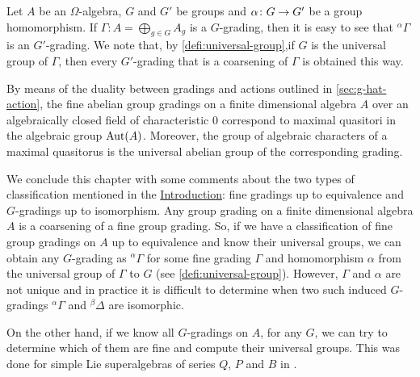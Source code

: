 \begin{remark}\label{rmk:coars-grp-induced}
    Let $A$ be an $\Omega$-algebra, $G$ and $G'$ be groups and $\alpha\colon G \to G'$ be a group homomorphism. 
    If $\Gamma : A = \bigoplus_{g\in G} A_g$ is a $G$-grading, then it is easy to see that ${}^{\alpha} \Gamma$ is an $G'$-grading. 
    We note that, by \cref{defi:universal-group},if $G$ is the universal group of $\Gamma$, then every $G'$-grading that is a coarsening of $\Gamma$ is obtained this way.  
\end{remark}

By means of the duality between gradings and actions outlined in \cref{sec:g-hat-action}, the fine abelian group gradings on a finite dimensional algebra $A$ over an algebraically closed field of characteristic $0$ correspond to maximal quasitori in the algebraic group $\operatorname{Aut}(A)$. 
Moreover, the group of algebraic characters of a maximal quasitorus is the universal abelian group of the corresponding grading.  

We conclude this chapter with some comments about the two types of classification mentioned in the \hyperref[intro-equiv]{Introduction}: fine gradings up to equivalence and $G$-gradings up to isomorphism. 
%
Any group grading on a finite dimensional algebra $A$ is a coarsening of a fine group grading. 
So, if we have a classification of fine group gradings on $A$ up to equivalence and know their universal groups, we can obtain any $G$-grading as $^{\alpha}\Gamma$ for some fine grading $\Gamma$ and homomorphism $\alpha$ from the universal group of $\Gamma$ to $G$ (see \cref{defi:universal-group}). 
However, $\Gamma$ and $\alpha$ are not unique and in practice it is difficult to determine when two such induced $G$-gradings $^{\alpha}\Gamma$ and $^{\beta}\Delta$ are isomorphic. 

On the other hand, if we know all $G$-gradings on $A$, for any $G$, we can try to determine which of them are fine and compute their universal groups. 
This was done for simple Lie superalgebras of series $Q$, $P$ and $B$ in \cite{paper-Qn,paper-MAP,Helens_thesis}. 




